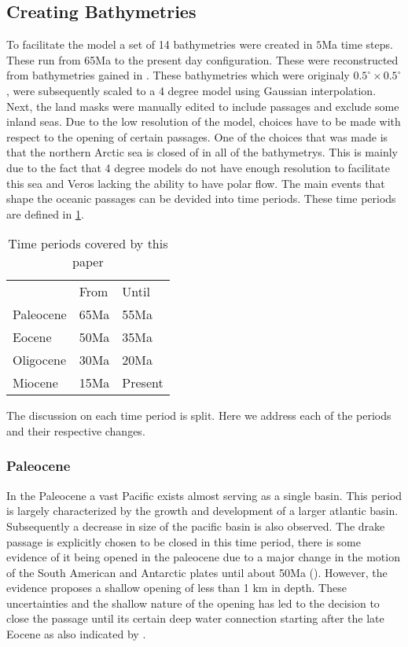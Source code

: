 \subsection{Creating Bathymetries} \label{sec:bathys}
To facilitate the model a set of 14 bathymetries were created in $5$Ma time steps. These run from 65Ma to the present day configuration. These were reconstructed from bathymetries gained in \cite{Baatsen2016Aug}.
These bathymetries which were originaly $0.5^{\circ} \times0.5^{\circ}$, were subsequently scaled to a 4 degree model using Gaussian interpolation. Next, the land masks were manually edited to include passages and exclude some inland seas. Due to the low resolution of the model, choices have to be made with respect to the opening of certain passages. One of the choices that was made is that the northern Arctic sea is closed of in all of the bathymetrys. This is mainly due to the fact that 4 degree models do not have enough resolution to facilitate this sea and Veros lacking the ability to have polar flow.
The main events that shape the oceanic passages can be devided into time periods. These time periods are defined in \cref{tab:timeperiods}.
\begin{table}[H]
\centering
	\begin{tabular}{lll}
		&From &Until \\
		Paleocene & 65Ma&55Ma    \\
		Eocene    & 50Ma&35Ma     \\
		Oligocene & 30Ma&20Ma    \\
		Miocene   & 15Ma&Present 
	\end{tabular}
\caption{Time periods covered by this paper}
\label{tab:timeperiods}
\end{table}
The discussion on each time period is split. Here we address each of the periods and their respective changes.
\subsubsection{Paleocene}
In the Paleocene a vast Pacific exists almost serving as a single basin. This period is largely characterized by the growth and development of a larger atlantic basin. Subsequently a decrease in size of the pacific basin is also observed. The drake passage is explicitly chosen to be closed in this time period, there is some evidence of it being opened in the paleocene due to a major change in the motion of the South American and Antarctic plates until about 50Ma (\cite{Livermore2005Jul}). However, the evidence proposes a shallow opening of less than 1 km in depth. These uncertainties and the shallow nature of the opening has led to the decision to close the passage until its certain deep water connection starting after the late Eocene as also indicated by \cite{Livermore2005Jul}.

